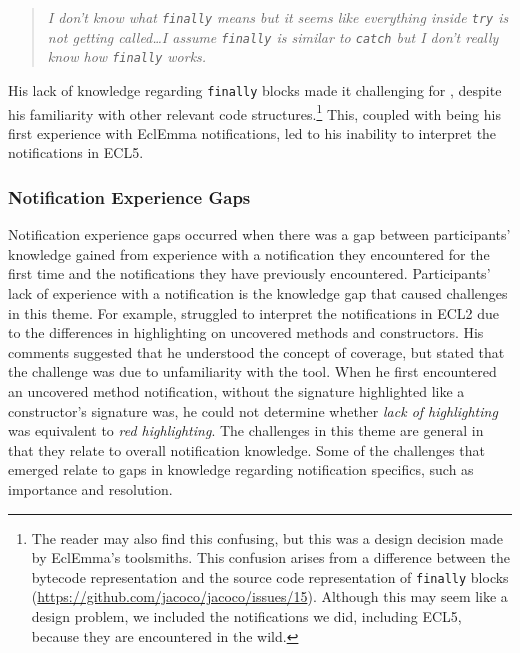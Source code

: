 \begin{quote}
	\textit{I don't know what \texttt{finally} means but it seems like everything inside \texttt{try} 
	is not getting called\ldots I assume \texttt{finally} is similar to \texttt{catch} 
	but I don't really know how \texttt{finally} works.}
\end{quote}

\noindent
His lack of knowledge regarding \texttt{finally} blocks made it challenging for , 
despite his familiarity with other relevant code structures.\footnote{The reader may also find this confusing, but this was a design decision made by EclEmma's toolsmiths. This confusion arises from a difference between the bytecode representation and the source code representation of \texttt{finally} blocks (\url{https://github.com/jacoco/jacoco/issues/15}). Although this may seem like a design problem, we included the notifications we did, including ECL5, because they are encountered in the wild.}
This, coupled with being his first experience with EclEmma notifications, led to his inability to interpret the notifications in ECL5.

\subsubsection{Notification Experience Gaps}\label{subsec:notif}
Notification experience gaps occurred when there was a gap between participants' knowledge gained 
from experience with a notification they encountered for the first time and the notifications they have previously encountered. 
Participants' lack of experience with a notification is the knowledge gap that caused challenges in this theme.
For example,  struggled to interpret the notifications in ECL2 due to the differences in highlighting on uncovered methods and constructors.  His comments suggested that he understood the concept of coverage, but stated that the challenge was due to unfamiliarity with the tool.
When he first encountered an uncovered method notification, without the signature highlighted like a constructor's signature was, he could not determine whether \emph{lack of highlighting} was equivalent to \emph{red highlighting}.
The challenges in this theme are general in that they relate to overall notification knowledge. Some of the challenges that emerged relate to gaps in knowledge regarding notification specifics, such as importance and resolution. 

